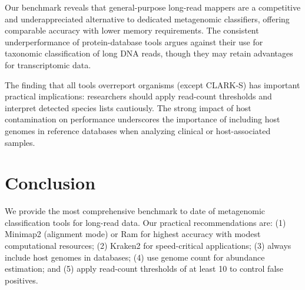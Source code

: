 \documentclass[11pt]{article}
\begin{document}
Our benchmark reveals that general-purpose long-read mappers are a competitive and underappreciated alternative to dedicated metagenomic classifiers, offering comparable accuracy with lower memory requirements. The consistent underperformance of protein-database tools argues against their use for taxonomic classification of long DNA reads, though they may retain advantages for transcriptomic data.

The finding that all tools overreport organisms (except CLARK-S) has important practical implications: researchers should apply read-count thresholds and interpret detected species lists cautiously. The strong impact of host contamination on performance underscores the importance of including host genomes in reference databases when analyzing clinical or host-associated samples.

\section{Conclusion}

We provide the most comprehensive benchmark to date of metagenomic classification tools for long-read data. Our practical recommendations are: (1) Minimap2 (alignment mode) or Ram for highest accuracy with modest computational resources; (2) Kraken2 for speed-critical applications; (3) always include host genomes in databases; (4) use genome count for abundance estimation; and (5) apply read-count thresholds of at least 10 to control false positives.



\end{document}
